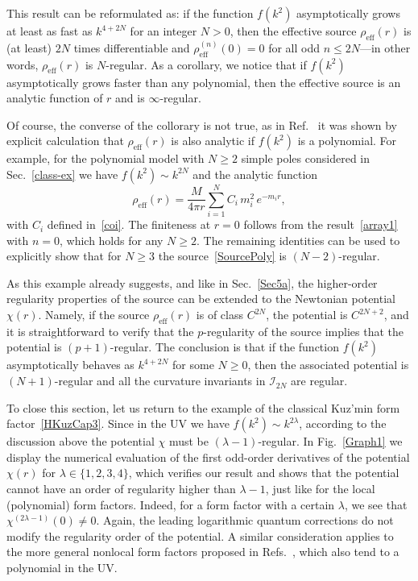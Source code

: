 \documentclass[aps,prd,a4paper,twocolumn,showpacs,showkeys,preprintnumbers,amsmath,amssymb,nofootinbib]{revtex4-2}
\numberwithin{equation}{section}
\def\beq{\begin{equation}}
\def\eeq{\end{equation}}
\def\la{\lambda}
\begin{document}
This result can be reformulated as: if the function $f(k^2)$ asymptotically grows at least as fast as $k^{4+2N}$ for an integer $N>0$, then the effective source $\rho_\text{eff}(r)$ is (at least) $2N$ times differentiable and $\rho_\text{eff}^{(n)}(0)=0$ for all odd $n \leqslant 2N$---in other words, $\rho_\text{eff}(r)$ is $N$-regular.
As a corollary, we notice that if $f(k^2)$ asymptotically grows faster than any polynomial, then the effective source is an analytic function of $r$ and is $\infty$-regular.

Of course, the converse of the collorary is not true, as in Ref.~\cite{BreTib2} it was shown by explicit calculation that $\rho_\text{eff}(r)$ is also analytic if $f(k^2)$ is a polynomial.
For example, for the polynomial model with $N\geqslant 2$ simple poles considered in Sec.~\ref{class-ex} we have $f(k^2)\sim k^{2N}$ and the analytic function~\cite{BreTib2}
\beq \label{SourcePoly}
\rho_\text{eff}(r) = \frac{M}{4\pi r} \sum_{i=1}^N  C_i \, m_i^2 \, e^{-m_i r} ,
\eeq
with $C_i$ defined in~\eqref{coi}. The finiteness at $r=0$ follows from the result~\eqref{array1} with $n=0$, which holds for any $N\geqslant 2$. The remaining identities can be used to explicitly show that for $N\geqslant 3$ the source~\eqref{SourcePoly} is $(N-2)$-regular.

As this example already suggests, and like in Sec.~\ref{Sec5a}, the higher-order regularity properties of the source can be extended to the Newtonian potential $\chi(r)$. Namely, if the source $\rho_\text{eff}(r)$ is of class $C^{2N}$, the potential is $C^{2N+2}$, and it is straightforward to verify that the $p$-regularity of the source implies that the potential is $(p+1)$-regular. The conclusion is that if the function $f(k^2)$ asymptotically behaves as $k^{4+2N}$ for some $N\geqslant 0$, then the associated potential is $(N+1)$-regular and all the curvature invariants in $\mathscr{I}_{2N}$ are regular.

To close this section, let us return to the example of the classical Kuz'min form factor~\eqref{HKuzCap3}. Since in the UV we have $f(k^2) \sim k^{2\la}$, according to the discussion above the potential $\chi$ must be $(\la-1)$-regular.
In Fig.~\ref{Graph1} we display the numerical evaluation of the first odd-order derivatives of the potential $\chi(r)$ for $\la\in\lbrace 1,2,3,4\rbrace$, which verifies our result and shows that the potential cannot have an order of regularity higher than $\la-1$, just like for the local (polynomial) form factors. Indeed, for a form factor with a certain $\la$, we see that $\chi^{(2\la-1)}(0)\neq 0$. Again, the leading logarithmic quantum corrections do not modify the regularity order of the potential.  A similar consideration applies to the more general nonlocal form factors proposed in Refs.~\cite{Tomboulis,Modesto12}, which also tend to a polynomial in the UV.
\end{document}
